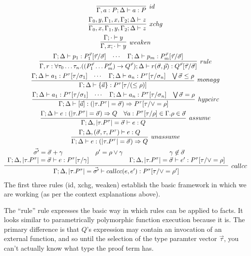 \begin{gather*}
  \infer[id]{\Gamma, a : P; \Delta \ds a : P}{}\\
  \infer[xchg]{\Gamma_0, x, \Gamma_1, y, \Gamma_2; \Delta \ds z}{\Gamma_0, y, \Gamma_1, x, \Gamma_2; \Delta \ds z}\\
  \infer[weaken]{\Gamma, x; \cdot \ds y}{\Gamma; \cdot \ds y}\\
  \infer[rule]{\Gamma, r : \forall \tau_0 \ldots \tau_n. ((P_1^{\vec{\tau}} \ldots P_m^{\vec{\tau}}) \rightarrow Q^{\vec{\tau}}); \Delta \ds r(\vec{\sigma}, \vec{p}) : Q^{\vec{\tau}}[\vec{\tau}/\vec{\sigma}]}{\Gamma; \Delta \ds p_1 : P_1^{\vec{\tau}}[\vec{\tau}/\vec{\sigma}] & \cdots & \Gamma; \Delta \ds p_m : P_m^{\vec{\tau}}[\vec{\tau}/\vec{\sigma}]}\\
  \infer[monagg]{\Gamma; \Delta \ds \{\vec{a}\} : P^\tau[\tau/(\leq \rho)]}{\Gamma; \Delta \ds a_1 : P^\tau[\tau/\sigma_1] & \cdots & \Gamma; \Delta \ds a_n : P^\tau[\tau/\sigma_n] & \bigvee \vec{\sigma} \leq \rho}\\
  \infer[hypcirc]{\Gamma; \Delta\vdash [\vec{a}] : (|\tau. P^\tau| = \vec{\sigma}) \Rightarrow P^\tau[\tau/\vee = \rho]}{\Gamma; \Delta \ds a_1 : P^\tau[\tau/\sigma_1] & \cdots & \Gamma; \Delta \ds a_n : P^\tau[\tau/\sigma_n] & \bigvee \vec{\sigma} = \rho}\\
  \infer[assume]{\Gamma; \Delta,  |\tau. P^\tau| = \vec{\sigma} \ds e : Q}{\Gamma; \Delta \ds e: (|\tau. P^\tau| = \vec{\sigma}) \Rightarrow Q & \forall a : P^\tau[\tau/\rho] \in \Gamma. \rho \in \vec{\sigma}}\\
  \infer[unassume]{\Gamma; \Delta \ds e : (|\tau. P^\tau| = \vec{\sigma}) \Rightarrow Q}{\Gamma; \Delta, (\vec{\sigma}, \tau, P^\tau) \ds e : Q}\\
  \infer[callcc]{\Gamma; \Delta, |\tau. P^\tau| = \vec{\sigma'} \ds callcc(e, e') : P^\tau[\tau/\vee = \rho']}{
    \begin{array}{ccc}
      \vec{\sigma'} = \vec{\sigma} + \gamma & \rho' = \rho \vee \gamma & \gamma \not \in \vec{\sigma} \\
      \Gamma; \Delta, |\tau. P^\tau| = \vec{\sigma} \ds e : P^\tau[\tau/\gamma] & & \Gamma; \Delta, |\tau.P^\tau|=\vec{\sigma} \ds e' : P^\tau[\tau/\vee = \rho]
  \end{array}}
\end{gather*}
The first three rules (id, xchg, weaken) establish the basic framework in which we are working (as per the context explanations above).

The ``rule'' rule expresses the basic way in which rules can be applied to facts.
It looks similar to parametrically polymorphic function execution because it is.
The primary difference is that $Q$'s expression may contain an invocation of an external function, and so until the selection of the type paramter vector $\vec{\tau}$, you can't actually know what type the proof term has.

